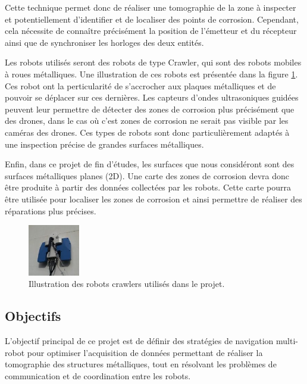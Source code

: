 \documentclass[init,francais,RandD]{rapportPFE}
\begin{document}
			Cette technique permet donc de réaliser une tomographie de la zone à inspecter et potentiellement d'identifier et de localiser des points de corrosion. Cependant, cela nécessite de connaître précisément la position de l'émetteur et du récepteur ainsi que de synchroniser les horloges des deux entités.

			Les robots utilisés seront des robots de type Crawler, qui sont des robots mobiles à roues métalliques. Une illustration de ces robots est présentée dans la figure \ref{fig:robots}. Ces robot ont la perticularité de s'accrocher aux plaques métalliques et de pouvoir se déplacer sur ces dernières. Les capteurs d'ondes ultrasoniques guidées peuvent leur permettre de détecter des zones de corrosion plus précisément que des drones, dans le cas où c'est zones de corrosion ne serait pas visible par les caméras des drones. Ces types de robots sont donc particulièrement adaptés à une inspection précise de grandes surfaces métalliques.

			Enfin, dans ce projet de fin d'études, les surfaces que nous considéront sont des surfaces métalliques planes (2D). Une carte des zones de corrosion devra donc être produite à partir des données collectées par les robots. Cette carte pourra être utilisée pour localiser les zones de corrosion et ainsi permettre de réaliser des réparations plus précises.

			\begin{figure}[h]
				\centering
				\includegraphics[width=0.2\textwidth]{graphics/altiscan_closeup-150x150.jpg}
				\caption{Illustration des robots crawlers utilisés dans le projet.}
				\label{fig:robots}
			\end{figure}
		\subsection{Objectifs}
			L'objectif principal de ce projet est de définir des stratégies de navigation multi-robot pour optimiser l'acquisition de données permettant de réaliser la tomographie des structures métalliques, tout en résolvant les problèmes de communication et de coordination entre les robots.
\end{document}
